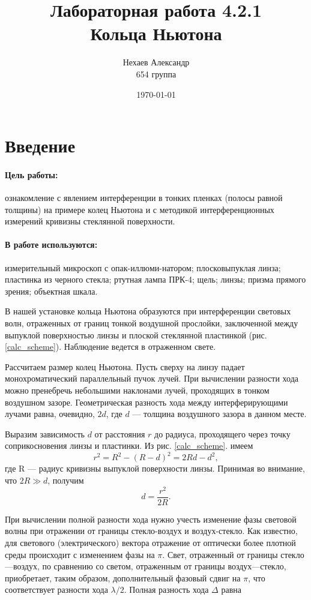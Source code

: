 \documentclass[a4paper, 12pt]{article}
\title{Лабораторная работа 4.2.1\\Кольца Ньютона}
\author{Нехаев Александр\\654 группа}
\date{\today}
\begin{document}
	\maketitle
	\newpage
	\tableofcontents
	\newpage
	\section{Введение}
	\paragraph{Цель работы:} ознакомление с явлением интерференции в тонких пленках (полосы равной толщины) на примере колец Ньютона и с методикой интерференционных измерений кривизны стеклянной поверхности.
	\paragraph{В работе используются:} измерительный микроскоп с опак-иллюми-натором; плосковыпуклая линза; пластинка из черного стекла; ртутная лампа ПРК-4; щель; линзы; призма прямого зрения; объектная шкала.\par
	В нашей установке кольца Ньютона образуются при интерференции световых волн, отраженных от границ тонкой воздушной прослойки, заключенной между выпуклой поверхностью линзы и плоской стеклянной пластинкой (рис. \ref{calc_scheme}). Наблюдение ведется в отраженном свете.\par
	Рассчитаем размер колец Ньютона. Пусть сверху на линзу падает монохроматический параллельный пучок лучей. При вычислении разности хода можно пренебречь небольшими наклонами лучей, проходящих в тонком воздушном зазоре. Геометрическая разность хода между интерферирующими лучами равна, очевидно, $2d$, где $d$ — толщина воздушного зазора в данном месте.\par
	Выразим зависимость $d$ от расстояния $r$ до радиуса, проходящего через точку соприкосновения линзы и пластинки. Из рис. \ref{calc_scheme}. имеем
	\begin{equation*}
		r^2=R^2-\left(R-d\right)^2=2Rd-d^2,
	\end{equation*}
	где R — радиус кривизны выпуклой поверхности линзы. Принимая во внимание, что $2R\gg d$, получим
	\begin{equation}
		d=\frac{r^2}{2R}.
	\end{equation}
	\par
	При вычислении полной разности хода нужно учесть изменение фазы световой волны при отражении от границы стекло-воздух и воздух-стекло. Как известно, для светового (электрического) вектора отражение от оптически более плотной среды происходит с изменением фазы на $\pi$. Свет, отраженный от границы стекло—воздух, по сравнению со светом, отраженным от границы воздух—стекло, приобретает, таким образом, дополнительный фазовый сдвиг на $\pi$, что соответствует разности хода $\lambda/2$. Полная разность хода $\Delta$ равна
\end{document}
